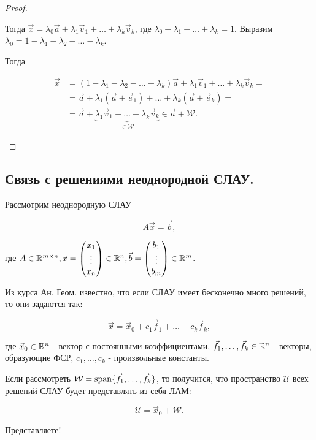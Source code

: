 \begin{proof}
\begin{enumerate}
        Тогда $\vec{x} = \lambda_0\vec{a} + \lambda_1\vec{v}_1 + \ldots + \lambda_k\vec{v}_k$, где $\lambda_0 + \lambda_1 + \ldots + \lambda_k = 1$. Выразим $\lambda_0 = 1 - \lambda_1 - \lambda_2 - \ldots - \lambda_k$.

        Тогда

        \begin{align*}
            \vec{x} &= (1 - \lambda_1 - \lambda_2 - \ldots - \lambda_k)\vec{a} + \lambda_1\vec{v}_1 + \ldots + \lambda_k\vec{v}_k = \\
            &= \vec{a} + \lambda_1(\vec{a} + \vec{e}_1) + \ldots + \lambda_k(\vec{a} + \vec{e}_k) = \\
            &= \vec{a} + \underbrace{\lambda_1\vec{v}_1 + \ldots + \lambda_k\vec{v}_k}_{\in \mathcal{W}} \in \vec{a} + \mathcal{W}.
        \end{align*}
    \end{enumerate}
\end{proof}


\subsection{
    Связь с решениями неоднородной СЛАУ.
}

Рассмотрим неоднородную СЛАУ

$$A\vec{x} = \vec{b},$$

где $A \in \mathbb{R}^{m \times n}, \vec{x} = \begin{pmatrix} x_1 \\ \vdots \\ x_n \end{pmatrix} \in \mathbb{R}^n, \vec{b} = \begin{pmatrix} b_1 \\ \vdots \\ b_m \end{pmatrix} \in \mathbb{R}^m$.

Из курса Ан. Геом. известно, что если СЛАУ имеет бесконечно много решений, то они задаются так:

$$\vec{x} = \vec{x}_0 + c_1\vec{f}_1 + \ldots + c_k\vec{f}_k,$$

где $\vec{x}_0 \in \mathbb{R}^n$ - вектор с постоянными коэффициентами, $\vec{f}_1, \ldots, \vec{f}_k \in \mathbb{R}^n$ - векторы, образующие ФСР, $c_1, \ldots, c_k$ - произвольные константы.

Если рассмотреть $\mathcal{W} = \operatorname{\mathop{\mathrm{span}}} \{\vec{f}_1, \ldots, \vec{f}_k\}$, то получится, что пространство $\mathcal{U}$ всех решений СЛАУ будет представлять из себя ЛАМ:

$$\mathcal{U} = \vec{x}_0 + \mathcal{W}.$$

Представляете!
